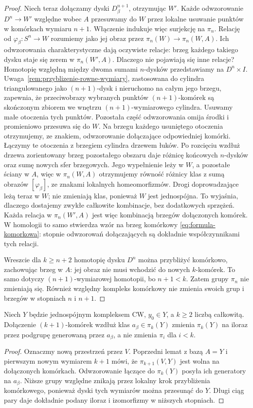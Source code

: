 \begin{proof}
Niech teraz dołączamy dyski $D^{n+1}_\beta$, otrzymując $W'$.
Każde odwzorowanie $D^n\to W'$ względne wobec $A$ przesuwamy do $W$
przez lokalne usuwanie punktów w komórkach wymiaru $n+1$.
Włączenie indukuje więc surjekcję na $\pi_n$.
Relację od $\varphi_\beta:S^n\to W$ rozumiemy jako jej obraz
przez $\pi_n(W)\to\pi_n(W,A)$.
Ich odwzorowania charakterystyczne
dają oczywiste relacje:
brzeg każdego takiego
dysku staje się zerem
w $\pi_n(W',A)$.
Dlaczego nie pojawiają
się inne relacje?
Homotopię względną
między dwoma sumami
$n$-dysków przedstawiamy
na $D^n\times I$.
Uwaga~\ref{rem:przyblizenie-rowne-wymiary}, zastosowana do cylindra
triangulowanego jako $(n+1)$-dysk i nieruchomo na całym jego brzegu,
zapewnia, że przeciwobrazy wybranych punktów $(n+1)$-komórek
są skończonym zbiorem
we wnętrzu $(n+1)$-wymiarowego
cylindra. Usuwamy małe
otoczenia tych punktów.
Pozostała część odwzorowania
omija środki i promieniowo
przesuwa się do $W$.
Na brzegu każdego
usuniętego otoczenia
otrzymujemy, ze znakiem,
odwzorowanie dołączające
odpowiedniej komórki.
Łączymy te otoczenia z brzegiem cylindra drzewem łuków.
Po rozcięciu wzdłuż drzewa zorientowany brzeg pozostałego obszaru
daje różnicę końcowych $n$-dysków oraz sumę nowych sfer brzegowych.
Jego wypełnienie leży w $W$, a pozostałe ściany w $A$,
więc w $\pi_n(W,A)$ otrzymujemy równość różnicy klas z sumą
obrazów $[\varphi_\beta]$, ze znakami lokalnych homeomorfizmów.
Drogi doprowadzające leżą teraz w $W$; nie zmieniają klas,
ponieważ $W$ jest jednospójna. To wyjaśnia, dlaczego dostajemy
zwykłe całkowite kombinacje, bez dodatkowych sprzężeń.
Każda relacja w
$\pi_n(W',A)$
jest więc kombinacją
brzegów dołączonych
komórek.
W homologii to samo
stwierdza wzór
na brzeg komórkowy
\eqref{eq:formula-komorkowa}:
stopnie odwzorowań dołączających
są dokładnie
współczynnikami
tych relacji.

Wreszcie dla $k\geq n+2$
homotopię dysku $D^n$
można przybliżyć
komórkowo, zachowując
brzeg w $A$: jej obraz
nie musi wchodzić
do nowych $k$-komórek.
To samo dotyczy
$(n+1)$-wymiarowej
homotopii, bo $n+1<k$.
Zatem grupy $\pi_n$
nie zmieniają się.
Również względny
kompleks komórkowy
nie zmienia swoich
grup i brzegów
w stopniach $n$ i $n+1$.
\end{proof}

\begin{wniosek}
\label{cor:zabijanie-klas-pi}
Niech $Y$ będzie jednospójnym kompleksem CW,
$y_0\in Y$, a $k\geq2$ liczbą całkowitą.
Dołączenie $(k+1)$-komórek wzdłuż klas $a_\beta\in\pi_k(Y)$
zmienia $\pi_k(Y)$ na iloraz przez podgrupę generowaną przez $a_\beta$,
a nie zmienia $\pi_i$ dla $i<k$.
\end{wniosek}
\begin{proof}
Oznaczmy nową przestrzeń przez $V$. Poprzedni lemat z bazą $A=Y$
i pierwszym nowym wymiarem $k+1$ mówi, że
$\pi_{k+1}(V,Y)$ jest wolna na dołączonych komórkach.
Odwzorowanie łączące do $\pi_k(Y)$ posyła ich generatory na $a_\beta$.
Niższe grupy względne znikają przez lokalny krok przybliżenia
komórkowego, ponieważ dyski tych wymiarów można przesunąć do $Y$.
Długi ciąg pary daje dokładnie podany iloraz i izomorfizmy w niższych stopniach.
\end{proof}

